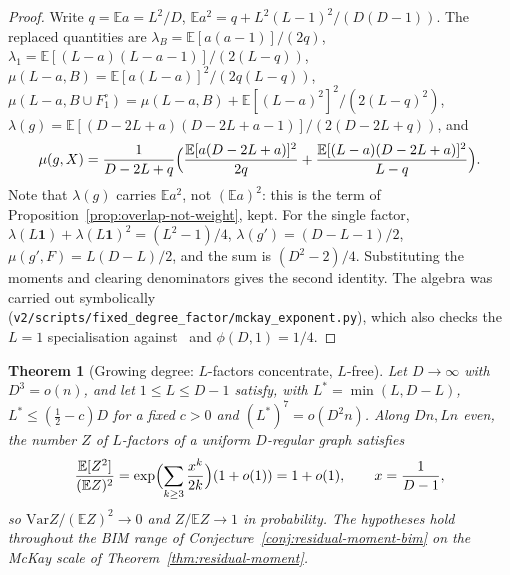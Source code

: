 \documentclass[11pt]{article}
\newtheorem{theorem}{Theorem}
\newcommand{\EE}{\mathbb{E}}
\newcommand{\Var}{\mathrm{Var}}
\begin{document}
\begin{proof}
Write \(q=\EE a=L^2/D\), \(\EE a^2=q+L^2(L-1)^2/(D(D-1))\). The replaced
quantities are
\(\lambda_B=\EE[a(a-1)]/(2q)\),
\(\lambda_1=\EE[(L-a)(L-a-1)]/(2(L-q))\),
\(\mu(L-a,B)=\EE[a(L-a)]^2/(2q(L-q))\),
\(\mu(L-a,B\cup F_1^\circ)=\mu(L-a,B)+\EE[(L-a)^2]^2/(2(L-q)^2)\),
\(\lambda(g)=\EE[(D-2L+a)(D-2L+a-1)]/(2(D-2L+q))\), and
\[
\mu(g,X)=\frac{1}{D-2L+q}\Bigl(\frac{\EE[a(D-2L+a)]^2}{2q}
+\frac{\EE[(L-a)(D-2L+a)]^2}{L-q}\Bigr).
\]
Note that \(\lambda(g)\) carries \(\EE a^2\), not \((\EE a)^2\): this is the
term of Proposition~\ref{prop:overlap-not-weight}, kept.
For the single factor, \(\lambda(L\mathbf 1)+\lambda(L\mathbf 1)^2=(L^2-1)/4\),
\(\lambda(g')=(D-L-1)/2\), \(\mu(g',F)=L(D-L)/2\), and the sum is
\((D^2-2)/4\). Substituting the moments and clearing denominators gives the
second identity. The algebra was carried out symbolically
(\texttt{v2/scripts/fixed\_degree\_factor/mckay\_exponent.py}), which also
checks the \(L=1\) specialisation against~\cite[eq.~(8)]{Gao21} and
\(\phi(D,1)=1/4\).
\end{proof}

\begin{theorem}[Growing degree: \(L\)-factors concentrate, \(L\)-free]
\label{thm:growing-degree-factor}
Let \(D\to\infty\) with \(D^3=o(n)\), and let \(1\le L\le D-1\) satisfy, with
\(L^*=\min(L,D-L)\), \(L^*\le(\tfrac12-c)D\) for a fixed \(c>0\) and
\((L^*)^7=o(D^2n)\). Along \(Dn,Ln\) even, the number \(Z\) of \(L\)-factors of
a uniform \(D\)-regular graph satisfies
\[
\frac{\EE[Z^2]}{(\EE Z)^2}
=
\exp\Bigl(\sum_{k\ge3}\frac{x^k}{2k}\Bigr)(1+o(1))
=
1+o(1),
\qquad x=\frac1{D-1},
\]
so \(\Var Z/(\EE Z)^2\to0\) and \(Z/\EE Z\to1\) in probability. The
hypotheses hold throughout the BIM range of
Conjecture~\ref{conj:residual-moment-bim} on the McKay scale of
Theorem~\ref{thm:residual-moment}.
\end{theorem}
\end{document}
